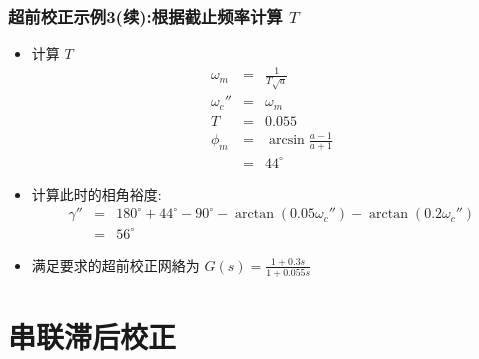 \documentclass[table]{beamer}
\begin{document}
\begin{frame}
\frametitle{超前校正示例3(续):根据截止频率计算  $T$}
\label{sec-2-2-10}

\begin{itemize}
\item 计算 $T$
       \begin{eqnarray*}
       \omega_m &=& \frac{1}{T\sqrt{a}} \\
       \omega_c'' &=& \omega_m \\
       T &=& 0.055 \\
       \phi_m &=& \arcsin\frac{a-1}{a+1} \\
       &=& 44^{\circ} 
       \end{eqnarray*}
\item <2->计算此时的相角裕度: 
       \begin{eqnarray*}
       \gamma'' &=& 180^{\circ}+44^{\circ}-90^{\circ}-\arctan(0.05\omega_c'')-\arctan(0.2\omega_c'') \\
       	&=& 56^{\circ}
       \end{eqnarray*}
\item <2->满足要求的超前校正网絡为  $G(s)=\frac{1+0.3s}{1+0.055s}$
\end{itemize}
\end{frame}
\section{串联滞后校正}
\label{sec-3}
\end{document}
